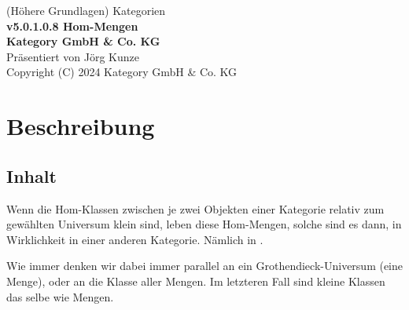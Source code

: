\documentclass[a4paper]{amsart}
\theoremstyle{definition}
\newcommand{\Set}{\text{\textbf{Set}}}
\begin{document}
\begin{titlepage}
\centering
{\huge
(Höhere Grundlagen) Kategorien\\[1cm]
\textbf{v5.0.1.0.8 Hom-Mengen}
}\\[1cm]

\textbf{Kategory GmbH \& Co. KG}\\
Präsentiert von Jörg Kunze\\
Copyright (C) 2024 Kategory GmbH \& Co. KG

\end{titlepage}

%

\newpage

\section*{Beschreibung}

\subsection*{Inhalt}
Wenn die Hom-Klassen zwischen je zwei Objekten einer Kategorie relativ zum gewählten Universum klein sind, leben diese Hom-Mengen, solche sind es dann, in Wirklichkeit in einer anderen Kategorie. Nämlich in \Set.

Wie immer denken wir dabei immer parallel an ein Grothendieck-Universum (eine Menge), oder an die Klasse aller Mengen. Im letzteren Fall sind kleine Klassen das selbe wie Mengen.
\end{document}
